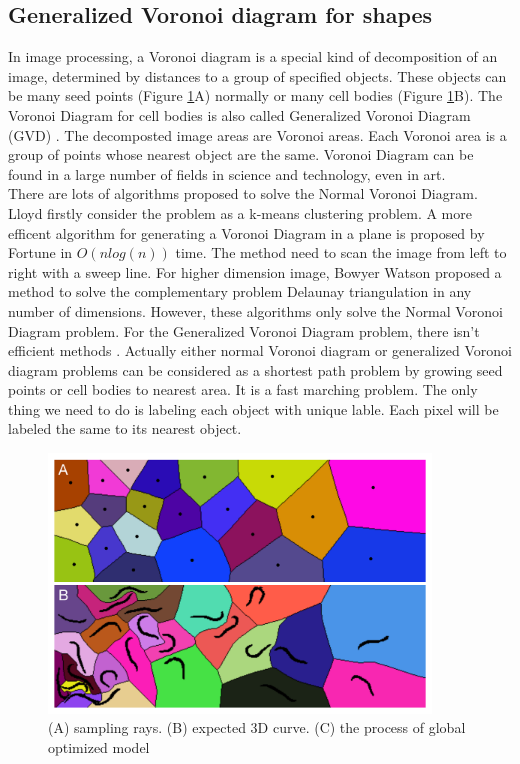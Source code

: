 \subsection{Generalized Voronoi diagram for shapes} \label{subsec:gvd}
In image processing, a Voronoi diagram \cite{aurenhammer1991Voronoi} is a special kind of decomposition of an image, determined by distances to a group of specified objects. These objects can be many seed points (Figure \ref{fig:fm-Voronoi}A) normally or many cell bodies (Figure \ref{fig:fm-Voronoi}B). The Voronoi Diagram for cell bodies is also called Generalized Voronoi Diagram (GVD) \cite{nath2007accurate}. The decomposted image areas are Voronoi areas. Each Voronoi area is a group of points whose nearest object are the same. Voronoi Diagram can be found in a large number of fields in science and technology, even in art.\\
There are lots of algorithms proposed to solve the Normal Voronoi Diagram. Lloyd \cite{lloyd1977triangulations} firstly consider the problem as a k-means clustering problem. A more efficent algorithm for generating a Voronoi Diagram in a plane is proposed by Fortune \cite{fortune1987sweepline} in $O(nlog(n))$ time. The method need to scan the image from left to right with a sweep line. For higher dimension image, Bowyer Watson \cite{rebay1993efficient} proposed a method to solve the complementary problem Delaunay triangulation in any number of dimensions. However, these algorithms only solve the Normal Voronoi Diagram problem. For the Generalized Voronoi Diagram problem, there isn't efficient methods \cite{hoff1999fast, takahashi1989motion, nath2007accurate}. Actually either normal Voronoi diagram or generalized Voronoi diagram problems can be considered as a shortest path problem by growing seed points or cell bodies to nearest area. It is a fast marching problem. The only thing we need to do is labeling each object with unique lable. Each pixel will be labeled the same to its nearest object.

\begin{figure}[htb]
\begin{center}
\includegraphics[width=4in]{images/fm_Voronoi}
\caption[Normal Voronoi diagram and generalized Voronoi diagram]{(A) sampling rays. (B) expected 3D curve. (C) the process of global optimized model}
\label{fig:fm-Voronoi}
\end{center}
\end{figure}
